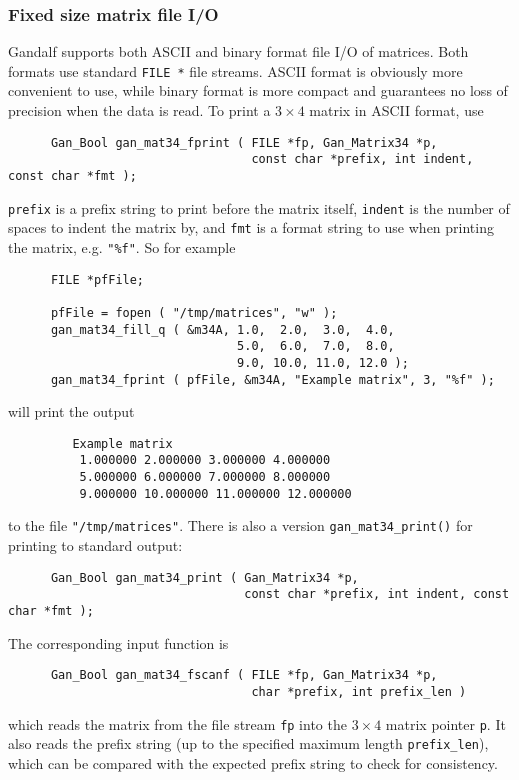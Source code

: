 \subsubsection{Fixed size matrix file I/O}
Gandalf supports both ASCII and binary format file I/O of matrices.
Both formats use standard {\tt FILE~*} file streams.
ASCII format is obviously more convenient to use, while binary format is
more compact and guarantees no loss of precision when the data is read.
To print a $3\times 4$ matrix in ASCII format, use
\begin{verbatim}
      Gan_Bool gan_mat34_fprint ( FILE *fp, Gan_Matrix34 *p,
                                  const char *prefix, int indent, const char *fmt );
\end{verbatim}
{\tt prefix} is a prefix string to print before the matrix itself, {\tt indent}
is the number of spaces to indent the matrix by, and {\tt fmt} is a format
string to use when printing the matrix, e.g. {\tt "\%f"}. So for example
\begin{verbatim}
      FILE *pfFile;

      pfFile = fopen ( "/tmp/matrices", "w" );
      gan_mat34_fill_q ( &m34A, 1.0,  2.0,  3.0,  4.0,
                                5.0,  6.0,  7.0,  8.0,
                                9.0, 10.0, 11.0, 12.0 );
      gan_mat34_fprint ( pfFile, &m34A, "Example matrix", 3, "%f" );
\end{verbatim}
will print the output
\begin{verbatim}
         Example matrix
          1.000000 2.000000 3.000000 4.000000
          5.000000 6.000000 7.000000 8.000000
          9.000000 10.000000 11.000000 12.000000
\end{verbatim}
to the file {\tt "/tmp/matrices"}.
There is also a version {\tt gan\_mat34\_print()} for printing to
standard output:
\begin{verbatim}
      Gan_Bool gan_mat34_print ( Gan_Matrix34 *p,
                                 const char *prefix, int indent, const char *fmt );
\end{verbatim}
The corresponding input function is
\begin{verbatim}
      Gan_Bool gan_mat34_fscanf ( FILE *fp, Gan_Matrix34 *p,
                                  char *prefix, int prefix_len )
\end{verbatim}
which reads the matrix from the file stream {\tt fp} into the $3\times 4$
matrix pointer {\tt p}. It also reads the prefix string (up to the specified
maximum length {\tt prefix\_len}), which can be compared with the expected
prefix string to check for consistency.

